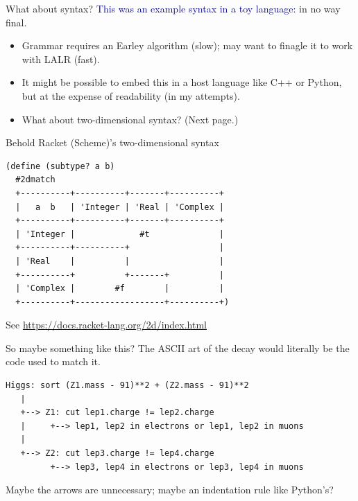 \documentclass[aspectratio=169]{beamer}
\begin{document}
\begin{frame}{What about syntax?}
\Large
\vspace{0.5 cm}
\textcolor{darkblue}{This was an example syntax in a toy language:} in no way final.

\large
\vspace{0.5 cm}
\begin{itemize}\setlength{\itemsep}{0.5 cm}
\item Grammar requires an Earley algorithm (slow); may want to finagle it to work with LALR (fast).
\item It might be possible to embed this in a host language like C++ or Python, but at the expense of readability (in my attempts).
\item What about two-dimensional syntax? (Next page.)
\end{itemize}
\end{frame}

\begin{frame}[fragile]{Behold Racket (Scheme)'s two-dimensional syntax}
\normalsize
\vspace{0.5 cm}

\begin{center}
\begin{minipage}{0.8\linewidth}
\begin{verbatim}
(define (subtype? a b)
  #2dmatch
  +----------+----------+-------+----------+
  |   a  b   | 'Integer | 'Real | 'Complex |
  +----------+----------+-------+----------+
  | 'Integer |             #t              |
  +----------+----------+                  |
  | 'Real    |          |                  |
  +----------+          +-------+          |
  | 'Complex |        #f        |          |
  +----------+------------------+----------+)
\end{verbatim}
\end{minipage}
\end{center}

\vspace{0.25 cm}
\small \hfill See \textcolor{blue}{\url{https://docs.racket-lang.org/2d/index.html}}
\end{frame}

\begin{frame}[fragile]{So maybe something like this?}
\large
\vspace{0.25 cm}
The ASCII art of the decay would literally be the code used to match it.

\normalsize
\vspace{0.5 cm}
\begin{verbatim}
Higgs: sort (Z1.mass - 91)**2 + (Z2.mass - 91)**2
   |
   +--> Z1: cut lep1.charge != lep2.charge
   |     +--> lep1, lep2 in electrons or lep1, lep2 in muons
   |
   +--> Z2: cut lep3.charge != lep4.charge
         +--> lep3, lep4 in electrons or lep3, lep4 in muons
\end{verbatim}

\large
\vspace{0.5 cm}
Maybe the arrows are unnecessary; maybe an indentation rule like Python's?
\end{frame}
\end{document}
